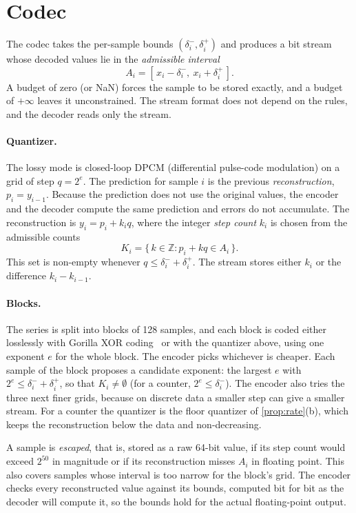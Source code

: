 \section{Codec}
\label{sec:codec}

The codec takes the per-sample bounds $(\delta^-_i, \delta^+_i)$ and
produces a bit stream whose decoded values lie in the \emph{admissible
interval}
\[
  A_i = [\,x_i - \delta^-_i,\ x_i + \delta^+_i\,].
\]
A budget of zero (or NaN) forces the sample to be stored exactly, and a
budget of $+\infty$ leaves it unconstrained. The stream format does not
depend on the rules, and the decoder reads only the stream.

\paragraph{Quantizer.} The lossy mode is closed-loop DPCM (differential
pulse-code modulation) on a grid of step $q = 2^e$. The prediction for
sample $i$ is the previous \emph{reconstruction}, $p_i = y_{i-1}$. Because
the prediction does not use the original values, the encoder and the
decoder compute the same prediction and errors do not accumulate. The
reconstruction is $y_i = p_i + k_i q$, where the integer \emph{step count}
$k_i$ is chosen from the admissible counts
\[
  K_i = \{\, k \in \mathbb{Z} : p_i + kq \in A_i \,\}.
\]
This set is non-empty whenever $q \le \delta^-_i + \delta^+_i$. The stream
stores either $k_i$ or the difference $k_i - k_{i-1}$.

\paragraph{Blocks.} The series is split into blocks of 128 samples, and
each block is coded either losslessly with Gorilla XOR
coding~\cite{pelkonen2015gorilla} or with the quantizer above, using one
exponent $e$ for the whole block. The encoder picks whichever is cheaper.
Each sample of the block proposes a candidate exponent: the largest $e$
with $2^e \le \delta^-_i + \delta^+_i$, so that $K_i \ne \emptyset$ (for a
counter, $2^e \le \delta^-_i$). The encoder also tries the three next
finer grids, because on discrete data a smaller step can give a smaller
stream. For a counter the quantizer is the floor quantizer of
\cref{prop:rate}(b), which keeps the reconstruction below the data and
non-decreasing.

A sample is \emph{escaped}, that is, stored as a raw 64-bit value, if its
step count would exceed $2^{50}$ in magnitude or if its reconstruction
misses $A_i$ in floating point. This also covers samples whose interval is
too narrow for the block's grid. The encoder checks every reconstructed
value against its bounds, computed bit for bit as the decoder will compute
it, so the bounds hold for the actual floating-point output.

